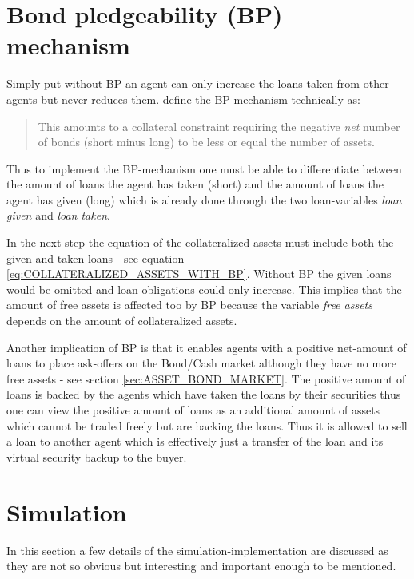 \documentclass[Bachelorarbeit.tex]{subfiles}
\begin{document}
\section{Bond pledgeability (BP) mechanism}
Simply put without BP an agent can only increase the loans taken from other agents but never reduces them. \cite{Breuer2015} define the BP-mechanism technically as: 

\begin{quote}
This amounts to a collateral constraint requiring the negative \textit{net} number of bonds (short minus long) to be less or equal the number of assets.
\end{quote}

Thus to implement the BP-mechanism one must be able to differentiate between the amount of loans the agent has taken (short) and the amount of loans the agent has given (long) which is already done through the two loan-variables \textit{loan given} and \textit{loan taken}.
 
\medskip

In the next step the equation of the collateralized assets must include both the given and taken loans - see equation \ref{eq:COLLATERALIZED_ASSETS_WITH_BP}. Without BP the given loans would be omitted and loan-obligations could only increase. This implies that the amount of free assets is affected too by BP because the variable \textit{free assets} depends on the amount of collateralized assets. 

\medskip

Another implication of BP is that it enables agents with a positive net-amount of loans to place ask-offers on the Bond/Cash market although they have no more free assets - see section \ref{sec:ASSET_BOND_MARKET}. The positive amount of loans is backed by the agents which have taken the loans by their securities thus one can view the positive amount of loans as an additional amount of assets which cannot be traded freely but are backing the loans. Thus it is allowed to sell a loan to another agent which is effectively just a transfer of the loan and its virtual security backup to the buyer.

\section{Simulation}
In this section a few details of the simulation-implementation are discussed as they are not so obvious but interesting and important enough to be mentioned.

\medskip
\end{document}
